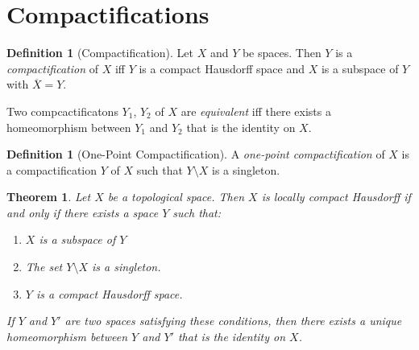\documentclass{report}
\newtheorem{thm}[lm]{Theorem}
\theoremstyle{definition}
\newtheorem{df}[lm]{Definition}
\begin{document}
  \section{Compactifications}

  \begin{df}[Compactification]
    Let $X$ and $Y$ be spaces. Then $Y$ is a \emph{compactification} of $X$ iff
    $Y$ is a compact Hausdorff space and $X$ is a subspace of $Y$ with
    $\overline{X} = Y$.

    Two compcactificatons $Y_1$, $Y_2$ of $X$ are \emph{equivalent} iff there exists a homeomorphism between $Y_1$ and $Y_2$ that is the identity on $X$.
  \end{df}

  \begin{df}[One-Point Compactification]
    A \emph{one-point compactification} of $X$ is a compactification $Y$ of $X$
    such that $Y \setminus X$ is a singleton.
  \end{df}

  \begin{thm}
    \label{thm:topology:locally_compact:one_point_compactification}
    Let $X$ be a topological space. Then $X$ is locally compact Hausdorff if
    and
    only if there exists a space $Y$ such that:
    \begin{enumerate}
      \item $X$ is a subspace of $Y$
      \item The set $Y \setminus X$ is a singleton.
      \item $Y$ is a compact Hausdorff space.
    \end{enumerate}
    If $Y$ and $Y'$ are two spaces satisfying these conditions, then there
    exists a
    unique homeomorphism between $Y$ and $Y'$ that is the identity on $X$.
  \end{thm}
\end{document}

